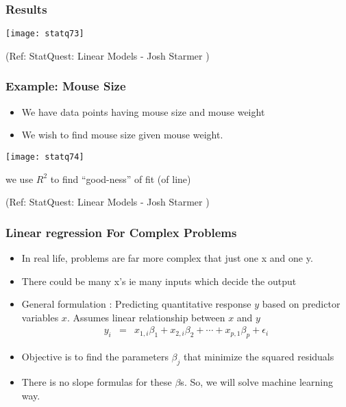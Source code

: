 \begin{frame}[fragile]\frametitle{Results}

\begin{center}
\texttt{[image: statq73]}
\end{center}

\tiny{(Ref: StatQuest: Linear Models - Josh Starmer )}	

\end{frame}


\begin{frame}[fragile]\frametitle{Example: Mouse Size }
\begin{itemize}
\item We have data points having mouse size and mouse weight
\item We wish to find mouse size given mouse weight.
\end{itemize}

\begin{center}
\texttt{[image: statq74]}
\end{center}

we use $R^2$ to find ``good-ness'' of fit (of line)

\tiny{(Ref: StatQuest: Linear Models - Josh Starmer )}	

\end{frame}



\begin{frame}[fragile]\frametitle{Linear regression For Complex Problems}
\begin{itemize}
\item In real life, problems are far more complex that just one x and one y. 
\item There could be many x's ie many inputs which decide the output
\item General formulation : Predicting quantitative response $y$ based on predictor variables $x$. Assumes linear relationship between $x$ and $y$
\[
\begin{array}{rcl}
y_i &=& x_{1,i} \beta_1 + x_{2,i} \beta_2 + \cdots + x_{p,1} \beta_p + \epsilon_i
\end{array}
\]
\item Objective is to find the parameters $\beta_j$ that minimize the squared residuals 
\item There is no slope formulas for these $\beta$s. So, we will solve machine learning way.
\end{itemize}


\end{frame}



